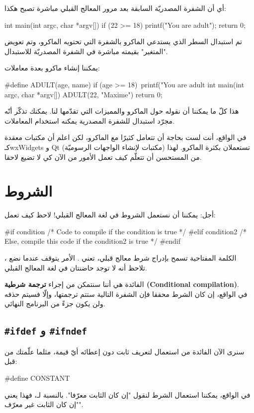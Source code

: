 أي أن الشفرة المصدريّة السابقة بعد مرور المعالج القبلي مباشرة تصبح هكذا:
\begin{Csource}
int main(int argc, char *argv[])
{
	if (22 >= 18)
		printf("You are adult\n");
	return 0;
}
\end{Csource}
تم استبدال السطر الذي يستدعي الماكرو بالشفرة التي تحتويه الماكرو، وتم تعويض "المتغير"
بقيمته مباشرة في الشفرة المصدريّة للاستبدال.

يمكننا إنشاء ماكرو بعدة معاملات:
\begin{Csource}
#define ADULT(age, name) if (age >= 18)\
			printf("You are adult %
int main(int argc, char *argv[])
{
	ADULT(22, "Maxime")
	return 0;
}
\end{Csource}
هذا كلّ ما يمكننا أن نقوله حول الماكرو والمميزات التي تقدّمها لنا. يمكنك تذكّر أنّه مجرّد استبدال للشفرة المصدرية يمكنه استخدام المعاملات.
\begin{information}
في الواقع، أنت لست بحاجة أن تتعامل كثيرًا مع الماكرو، لكن اعلم أن مكتبات معقدة كـ\textenglish{wxWidgets}
و \textenglish{Qt}
(مكتبات لإنشاء الواجهات الرسوميّة) تستعملان بكثرة الماكرو. لهذا من المستحسن أن تتعلّم كيف تعمل الأمور من الآن كي لا تضيع لاحقا.
\end{information}

\section{الشروط}
أجل: يمكننا أن نستعمل الشروط في لغة المعالج القبلي! لاحظ كيف تعمل:
\begin{Csource}
#if condition
  /* Code to compile if the condition is true */
#elif condition2
  /* Else, compile this code if the condition2 is true */
#endif
\end{Csource}
الكلمة المفتاحية
تسمح بإدراج شرط معالج قبلي،
تعني
.
الأمر يتوقف عندما نضع
،
تلاحظ أنه لا توجد حاضنتان في لغة المعالج القبلي.

الفائدة هي أننا سنتمكن من إجراء
\textbf{ترجمة شرطية
(\textenglish{Conditional compilation})}.\\
في الواقع، إن كان الشرط محققا فإن الشفرة التالية ستتم ترجمتها، وإلّا فسيتم حذفه ولن يكون جزءً من البرنامج النهائي.

\subsection{
\texttt{\#ifdef}
و
\texttt{\#ifndef}
}
سنرى الآن الفائدة من استعمال
لتعريف ثابت دون إعطائه أيّ قيمة، مثلما علّمتك من قبل:
\begin{Csource}
#define CONSTANT
\end{Csource}
في الواقع، يمكننا استعمال الشرط
لنقول "إن كان الثابت معرّفا".
بالنسبة لـ،
فهذا يعني "إن كان الثابت غير معرّف".

